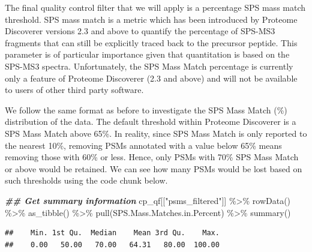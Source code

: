\documentclass[9pt,a4paper,]{extarticle}
\newenvironment{Shaded}{\begin{snugshade}}{\end{snugshade}}
\newcommand{\DocumentationTok}[1]{\textcolor[rgb]{0.56,0.35,0.01}{\textbf{\textit{#1}}}}
\newcommand{\FunctionTok}[1]{\textcolor[rgb]{0.00,0.00,0.00}{#1}}
\newcommand{\NormalTok}[1]{#1}
\newcommand{\SpecialCharTok}[1]{\textcolor[rgb]{0.00,0.00,0.00}{#1}}
\newcommand{\StringTok}[1]{\textcolor[rgb]{0.31,0.60,0.02}{#1}}
\begin{document}
The final quality control filter that we will apply is a percentage SPS mass
match threshold. SPS mass match is a metric which has been introduced by
Proteome Discoverer versions 2.3 and above to quantify the percentage of SPS-MS3
fragments that can still be explicitly traced back to the precursor peptide.
This parameter is of particular importance given that quantitation is based on
the SPS-MS3 spectra. Unfortunately, the SPS Mass Match percentage is currently
only a feature of Proteome Discoverer (2.3 and above) and will not be available
to users of other third party software.

We follow the same format as before to investigate the SPS Mass Match (\%)
distribution of the data. The default threshold within Proteome Discoverer is a
SPS Mass Match above 65\%. In reality, since SPS Mass Match is only reported to
the nearest 10\%, removing PSMs annotated with a value below 65\% means removing
those with 60\% or less. Hence, only PSMs with 70\% SPS Mass Match or above would
be retained. We can see how many PSMs would be lost based on such thresholds
using the code chunk below.

\begin{Shaded}
\begin{Highlighting}[]
\DocumentationTok{\#\# Get summary information}
\NormalTok{cp\_qf[[}\StringTok{"psms\_filtered"}\NormalTok{]] }\SpecialCharTok{\%\textgreater{}\%} 
  \FunctionTok{rowData}\NormalTok{() }\SpecialCharTok{\%\textgreater{}\%} 
  \FunctionTok{as\_tibble}\NormalTok{() }\SpecialCharTok{\%\textgreater{}\%} 
  \FunctionTok{pull}\NormalTok{(SPS.Mass.Matches.in.Percent) }\SpecialCharTok{\%\textgreater{}\%} 
  \FunctionTok{summary}\NormalTok{()}
\end{Highlighting}
\end{Shaded}

\begin{verbatim}
##    Min. 1st Qu.  Median    Mean 3rd Qu.    Max. 
##    0.00   50.00   70.00   64.31   80.00  100.00
\end{verbatim}
\end{document}
